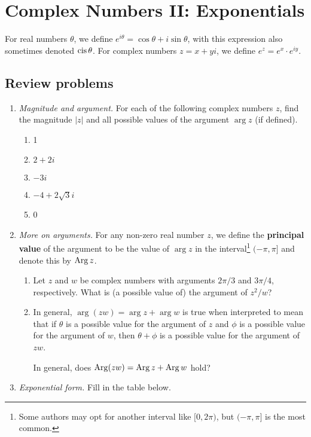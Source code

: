 \section{Complex Numbers II: Exponentials}

For real numbers $\theta$, we define $e^{i\theta} = \cos\theta + i\sin\theta$, with this expression also sometimes denoted $\operatorname{cis}\theta$. For complex numbers $z = x + yi$, we define $e^z = e^x\cdot e^{iy}$.

\subsection{Review problems}

\begin{enumerate}
\item \emph{Magnitude and argument.} For each of the following complex numbers $z$, find the magnitude $\lvert z\rvert$ and all possible values of the argument $\arg z$ (if defined).
\begin{enumerate}
\item 1
\item $2 + 2i$
\item $-3i$
\item $-4 + 2\sqrt{3}i$
\item 0
\end{enumerate}
\item \emph{More on arguments.} For any non-zero real number $z$, we define the \textbf{principal value} of the argument to be the value of $\arg z$ in the interval\footnote{Some authors may opt for another interval like $[0,2\pi)$, but $(-\pi,\pi]$ is the most common.} $(-\pi,\pi]$ and denote this by $\operatorname{Arg} z$.
\begin{enumerate}
\item Let $z$ and $w$ be complex numbers with arguments $2\pi/3$ and $3\pi/4$, respectively. What is (a possible value of) the argument of $z^2/w$?
\item In general, $\arg(zw) = \arg z + \arg w$ is true when interpreted to mean that if $\theta$ is a possible value for the argument of $z$ and $\phi$ is a possible value for the argument of $w$, then $\theta + \phi$ is a possible value for the argument of $zw$.\par
In general, does $\operatorname{Arg}(zw) = \operatorname{Arg} z + \operatorname{Arg} w$ hold?
\end{enumerate}
\item \emph{Exponential form.} Fill in the table below.
\begin{center}
\begingroup

\end{center}
\end{enumerate}
